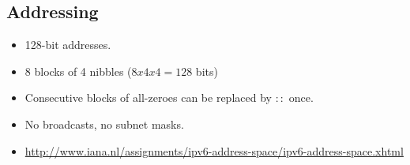 \documentclass{article}
\begin{document}
\subsection{Addressing}

\begin{itemize}
	\item 128-bit addresses.
	\item 8 blocks of 4 nibbles ($8x4x4 = 128$ bits)
	\item Consecutive blocks of all-zeroes can be replaced by $::$ once.
	\item No broadcasts, no subnet masks.
	\item \url{http://www.iana.nl/assignments/ipv6-address-space/ipv6-address-space.xhtml}
\end{itemize}


\printbibliography
\end{document}
